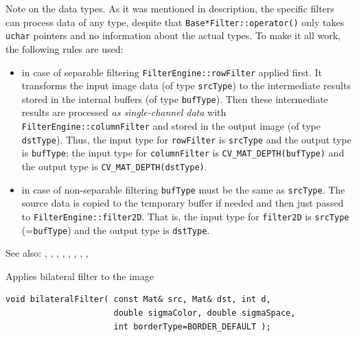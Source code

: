 Note on the data types. As it was mentioned in  description, the specific filters can process data of any type, despite that \texttt{Base*Filter::operator()} only takes \texttt{uchar} pointers and no information about the actual types. To make it all work, the following rules are used:

\begin{itemize}
    \item in case of separable filtering \texttt{FilterEngine::rowFilter} applied first. It transforms the input image data (of type \texttt{srcType}) to the intermediate results stored in the internal buffers (of type \texttt{bufType}). Then these intermediate results are processed \emph{as single-channel data} with \texttt{FilterEngine::columnFilter} and stored in the output image (of type \texttt{dstType}). Thus, the input type for \texttt{rowFilter} is \texttt{srcType} and the output type is \texttt{bufType}; the input type for \texttt{columnFilter} is \texttt{CV\_MAT\_DEPTH(bufType)} and the output type is \texttt{CV\_MAT\_DEPTH(dstType)}.
    
    \item in case of non-separable filtering \texttt{bufType} must be the same as \texttt{srcType}. The source data is copied to the temporary buffer if needed and then just passed to \texttt{FilterEngine::filter2D}. That is, the input type for \texttt{filter2D} is \texttt{srcType} (=\texttt{bufType}) and the output type is \texttt{dstType}.
\end{itemize}

See also: , , , ,
, , ,
, 

\label{bilateralFilter}
Applies bilateral filter to the image

\begin{lstlisting}
void bilateralFilter( const Mat& src, Mat& dst, int d,
                      double sigmaColor, double sigmaSpace,
                      int borderType=BORDER_DEFAULT );
\end{lstlisting}
\begin{description}
\end{description}

